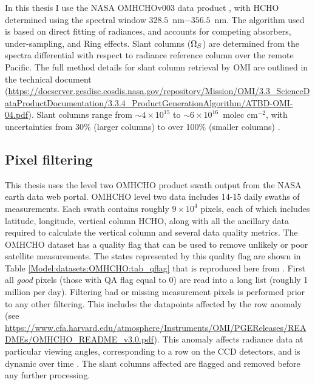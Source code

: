   In this thesis I use the NASA OMHCHOv003 data product \parencite{Abad2015}, with HCHO determined using the spectral window $328.5$~nm$ - 356.5$~nm. 
  The algorithm used is based on direct fitting of radiances, and accounts for competing absorbers, under-sampling, and Ring effects.
  Slant columns ($\Omega_{S}$) are determined from the spectra differential with respect to radiance reference column over the remote Pacific.
  The full method details for slant column retrieval by OMI are outlined 
  in the technical document (\url{https://docserver.gesdisc.eosdis.nasa.gov/repository/Mission/OMI/3.3_ScienceDataProductDocumentation/3.3.4_ProductGenerationAlgorithm/ATBD-OMI-04.pdf}).
  Slant columns range from $\sim 4\times 10^{15} $ to $\sim 6 \times 10^{16}$~molec cm$^{-2}$, with uncertainties from 30\% (larger columns) to over 100\% (smaller columns) \parencite{Abad2015}.
  

  \subsection{Pixel filtering}
  \label{Model:omhcho:pixel_filtering}
  
    This thesis uses the level two OMHCHO product swath output from the NASA earth data web portal.
    OMHCHO level two data includes 14-15 daily swaths of measurements.
    Each swath contains roughly $9 \times 10^4$ pixels, each of which includes latitude, longitude, vertical column HCHO, along with all the ancillary data required to calculate the vertical column and several data quality metrics.
    The OMHCHO dataset has a quality flag that can be used to remove unlikely or poor satellite measurements.
    The states represented by this quality flag are shown in Table \ref{Model:datasets:OMHCHO:tab_qflag} that is reproduced here from \textcite{Kurosu2014}.
    First all \textit{good} pixels (those with QA flag equal to 0) are read into a long list (roughly 1 million per day).
    Filtering bad or missing measurement pixels is performed prior to any other filtering.
    This includes the datapoints affected by the row anomaly (see \url{https://www.cfa.harvard.edu/atmosphere/Instruments/OMI/PGEReleases/READMEs/OMHCHO_README_v3.0.pdf}).
    This anomaly affects radiance data at particular viewing angles, corresponding to a row on the CCD detectors, and is dynamic over time \parencite{Huang2018}.
    The slant columns affected are flagged and removed before any further processing.
    
